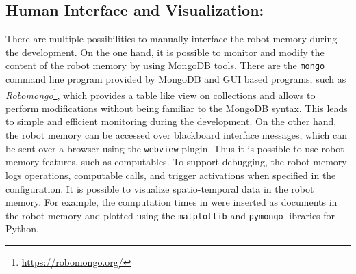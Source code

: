 \subsection{Human Interface and Visualization:}
There are multiple possibilities to manually interface the robot
memory during the development. On the one hand, it is possible to
monitor and modify the content of the robot memory by using MongoDB
tools. There are the \texttt{mongo} command line program provided by
MongoDB and GUI based programs, such as
\emph{Robomongo}\footnote{\url{https://robomongo.org/}}, which
provides a table like view on collections and allows to perform
modifications without being familiar to the MongoDB syntax. This
leads to simple and efficient monitoring during the development.
On the other hand, the robot memory can be
accessed over blackboard interface messages, which can be sent over a
browser using the \texttt{webview} plugin. Thus it is possible to use
robot memory features, such as computables. To support debugging, the
robot memory logs operations, computable calls, and trigger
activations when specified in the configuration. It is possible to
visualize spatio-temporal data in the robot memory. For example, the
computation times in  were inserted as
documents in the robot memory and plotted using the
\texttt{matplotlib} and \texttt{pymongo} libraries for Python.


